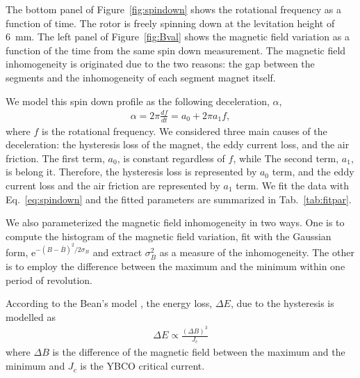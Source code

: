 \documentclass[journal]{IEEEtran}
\begin{document}
The bottom panel of Figure~\ref{fig:spindown} shows the rotational frequency as a function of time.
The rotor is freely spinning down at the levitation height of 6~mm.
The left panel of Figure~\ref{fig:Bval} shows the magnetic field variation as a function of the time from the same spin down measurement.
The magnetic field inhomogeneity is originated due to the two reasons: the gap between the segments and the inhomogeneity of each segment magnet itself.

We model this spin down profile as the following deceleration, $\alpha$,
\begin{eqnarray}
\alpha = 2\pi \frac{df}{dt} = a_0 + 2\pi a_1 f,
\label{eq:spindown}
\end{eqnarray}
where $f$ is the rotational frequency\cite{hull_review}.
We considered three main causes of the deceleration: the hysteresis loss of the magnet, the eddy current loss, and the air friction.
The first term, $a_0$, is constant regardless of $f$, while The second term, $a_1$, is belong it.
Therefore, the hysteresis loss is represented by $a_0$ term, and the eddy current loss and the air friction are represented by $a_1$ term.
We fit the data with Eq.~\ref{eq:spindown} and the fitted parameters are summarized in Tab.~\ref{tab:fitpar}.

We also parameterized the magnetic field inhomogeneity in two ways.
One is to compute the histogram of the magnetic field variation, fit with the Gaussian form, e$^{-(B-\bar{B})^2/2\sigma_B}$ and extract $\sigma_B^2$ as a measure of the inhomogeneity.
The other is to employ the difference between the maximum and the minimum within one period of revolution.

According to the Bean's model \cite{beans_model_1,beans_model_2}, the energy loss, $\Delta E$, due to the hysteresis is modelled as
\begin{eqnarray}
\Delta E \propto \frac{(\Delta B)^3}{J_c}
\label{eq:bean}
\end{eqnarray}
where $\Delta B$ is the difference of the magnetic field between the maximum and the minimum and $J_c$ is the YBCO critical current.
\end{document}

